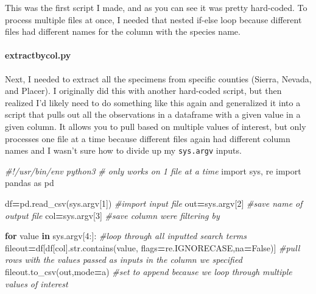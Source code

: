\documentclass[
]{article}
\newenvironment{Shaded}{\begin{snugshade}}{\end{snugshade}}
\newcommand{\BuiltInTok}[1]{#1}
\newcommand{\CommentTok}[1]{\textcolor[rgb]{0.56,0.35,0.01}{\textit{#1}}}
\newcommand{\ControlFlowTok}[1]{\textcolor[rgb]{0.13,0.29,0.53}{\textbf{#1}}}
\newcommand{\DecValTok}[1]{\textcolor[rgb]{0.00,0.00,0.81}{#1}}
\newcommand{\ImportTok}[1]{#1}
\newcommand{\KeywordTok}[1]{\textcolor[rgb]{0.13,0.29,0.53}{\textbf{#1}}}
\newcommand{\NormalTok}[1]{#1}
\newcommand{\OperatorTok}[1]{\textcolor[rgb]{0.81,0.36,0.00}{\textbf{#1}}}
\newcommand{\StringTok}[1]{\textcolor[rgb]{0.31,0.60,0.02}{#1}}
\newcommand{\VariableTok}[1]{\textcolor[rgb]{0.00,0.00,0.00}{#1}}
\begin{document}
This was the first script I made, and as you can see it was pretty
hard-coded. To process multiple files at once, I needed that nested
if-else loop because different files had different names for the column
with the species name.

\hypertarget{extractbycol.py}{%
\paragraph{extractbycol.py}\label{extractbycol.py}}

Next, I needed to extract all the specimens from specific counties
(Sierra, Nevada, and Placer). I originally did this with another
hard-coded script, but then realized I'd likely need to do something
like this again and generalized it into a script that pulls out all the
observations in a dataframe with a given value in a given column. It
allows you to pull based on multiple values of interest, but only
processes one file at a time because different files again had different
column names and I wasn't sure how to divide up my \texttt{sys.argv}
inputs.

\begin{Shaded}
\begin{Highlighting}[]
\CommentTok{\#!/usr/bin/env python3}
\CommentTok{\# only works on 1 file at a time}
\ImportTok{import}\NormalTok{ sys, re}
\ImportTok{import}\NormalTok{ pandas }\ImportTok{as}\NormalTok{ pd}

\NormalTok{df}\OperatorTok{=}\NormalTok{pd.read\_csv(sys.argv[}\DecValTok{1}\NormalTok{]) }\CommentTok{\#import input file}
\NormalTok{out}\OperatorTok{=}\NormalTok{sys.argv[}\DecValTok{2}\NormalTok{] }\CommentTok{\#save name of output file}
\NormalTok{col}\OperatorTok{=}\NormalTok{sys.argv[}\DecValTok{3}\NormalTok{] }\CommentTok{\#save column we\textquotesingle{}re filtering by}

\ControlFlowTok{for}\NormalTok{ value }\KeywordTok{in}\NormalTok{ sys.argv[}\DecValTok{4}\NormalTok{:]: }\CommentTok{\#loop through all inputted search terms}
\NormalTok{    fileout}\OperatorTok{=}\NormalTok{df[df[col].}\BuiltInTok{str}\NormalTok{.contains(value, flags}\OperatorTok{=}\NormalTok{re.IGNORECASE,na}\OperatorTok{=}\VariableTok{False}\NormalTok{)] }\CommentTok{\#pull   rows with the values passed as inputs in the column we specified}
\NormalTok{    fileout.to\_csv(out,mode}\OperatorTok{=}\StringTok{\textquotesingle{}a\textquotesingle{}}\NormalTok{) }\CommentTok{\#set to append because we loop through multiple values of interest}
\end{Highlighting}
\end{Shaded}
\end{document}

